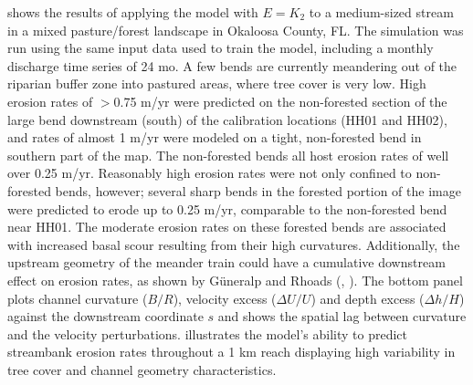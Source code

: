 \documentclass[preprint, review, authoryear, 12pt]{elsarticle}
\begin{document}
 shows the results of applying the model with $E=K_2$ to a medium-sized stream in a mixed pasture/forest landscape in Okaloosa County, FL. The simulation was run using the same input data used to train the model, including a monthly discharge time series of 24 mo. A few bends are currently meandering out of the riparian buffer zone into pastured areas, where tree cover is very low. High erosion rates of $>$0.75 m/yr were predicted on the non-forested section of the large bend downstream (south) of the calibration locations (HH01 and HH02), and rates of almost 1 m/yr were modeled on a tight, non-forested bend in southern part of the map. The non-forested bends all host erosion rates of well over 0.25 m/yr. Reasonably high erosion rates were not only confined to non-forested bends, however; several sharp bends in the forested portion of the image were predicted to erode up to 0.25 m/yr, comparable to the non-forested bend near HH01. The moderate erosion rates on these forested bends are associated with increased basal scour resulting from their high curvatures. Additionally, the upstream geometry of the meander train could have a cumulative downstream effect on erosion rates, as shown by G{\"u}neralp and Rhoads (\citeyear{Guneralp2009}, \citeyear{Guneralp2010}). The bottom panel plots channel curvature ($B/R$), velocity excess ($\Delta U/U$) and depth excess ($\Delta h/H$) against the downstream coordinate $s$ and shows the spatial lag between curvature and the velocity perturbations.  illustrates the model's ability to predict streambank erosion rates throughout a 1 km reach displaying high variability in tree cover and channel geometry characteristics. 
\end{document}
